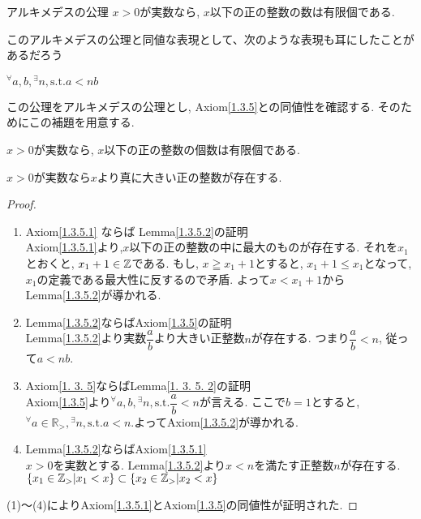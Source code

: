 \begin{axm}\label{1.3.5}
アルキメデスの公理 \quad $x>0$が実数なら, $x$以下の正の整数の数は有限個である. 
\end{axm}

このアルキメデスの公理と同値な表現として、次のような表現も耳にしたことがあるだろう
\begin{axm}\label{1.3.5.1}
\({}^\forall a, b , {}^\exists n, \mathrm{s.t.} a<nb\)
\end{axm}
この公理をアルキメデスの公理とし, Axiom\ref{1.3.5}との同値性を確認する. そのためにこの補題を用意する. 

\begin{lem}\label{1.3.5.2}
$x>0$が実数なら, $x$以下の正の整数の個数は有限個である.
\end{lem}


\begin{prop}
$x>0$が実数なら$x$より真に大きい正の整数が存在する.
\end{prop}

\begin{proof}
\begin{enumerate}
\renewcommand{\labelenumi}{(\arabic{enumi})}

\item Axiom\ref{1.3.5.1} ならば Lemma\ref{1.3.5.2}の証明
\\Axiom\ref{1.3.5.1}より,$x$以下の正の整数の中に最大のものが存在する. それを$x_1$とおくと, $x_1+1\in \mathbb{Z}$である. もし, $x\geqq x_1+1$とすると, $x_1+1\leq x_1$となって, $x_1$の定義である最大性に反するので矛盾. よって$x<x_1+1$からLemma\ref{1.3.5.2}が導かれる.
\item Lemma\ref{1.3.5.2}ならばAxiom\ref{1.3.5}の証明
\\Lemma\ref{1.3.5.2}より実数$\dfrac{a}{b}$より大きい正整数$n$が存在する. つまり$\dfrac{a}{b}<n$, 従って$a<nb$.
\item Axiom\ref{1. 3. 5}ならばLemma\ref{1. 3. 5. 2}の証明
\\Axiom\ref{1.3.5}より\({}^\forall a, b , {}^\exists n, \mathrm{s.t.}　\dfrac{a}{b}<n\)が言える. ここで$b=1$とすると, \({}^\forall a\in\mathbb{R_>},  {}^\exists n, \mathrm{s.t.} a<n\).よってAxiom\ref{1.3.5.2}が導かれる. 
\item Lemma\ref{1.3.5.2}ならばAxiom\ref{1.3.5.1}
\\$x>0$を実数とする. Lemma\ref{1.3.5.2}より$x<n$を満たす正整数$n$が存在する. $\{x_1\in\mathbb{Z}_>|x_1<x\}\subset\{x_2\in\mathbb{Z}_>|x_2<x\}$
\end{enumerate}
(1)～(4)によりAxiom\ref{1.3.5.1}とAxiom\ref{1.3.5}の同値性が証明された.
\end{proof}

